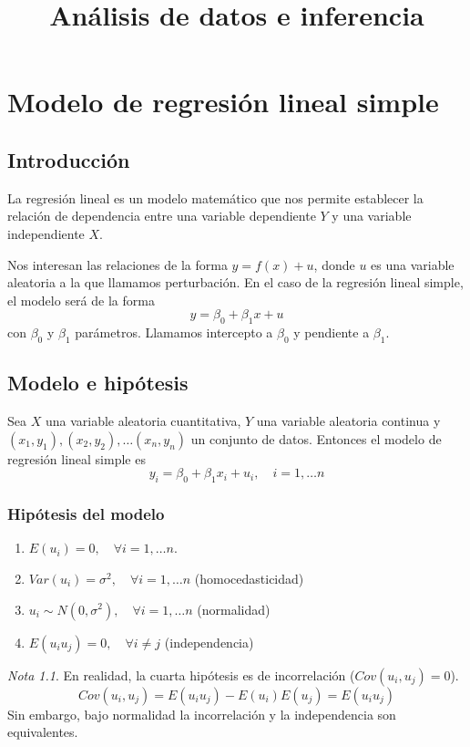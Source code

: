 \documentclass{report}
\title{Análisis de datos e inferencia}
\author{}
\theoremstyle{remark}
\theoremstyle{remark}
\newtheorem*{note}{Nota}
\theoremstyle{remark}
\theoremstyle{definition}
\theoremstyle{definition}
\theoremstyle{definition}
\begin{document}
\maketitle
\tableofcontents

\chapter{Modelo de regresión lineal simple}
\section{Introducción}

La regresión lineal es un modelo matemático que nos permite establecer la relación de dependencia entre una variable dependiente $Y$ y una variable independiente $X$.

Nos interesan las relaciones de la forma $y = f(x) + u$, donde $u$ es una variable aleatoria a la que llamamos perturbación.
En el caso de la regresión lineal simple, el modelo será de la forma $$y = \beta_0 + \beta_1x + u$$
con $\beta_0$ y $\beta_1$ parámetros.
Llamamos intercepto a $\beta_0$ y pendiente a $\beta_1$.

\section{Modelo e hipótesis}
Sea $X$ una variable aleatoria cuantitativa, $Y$ una variable aleatoria continua y $(x_1, y_1), (x_2, y_2), \dots (x_n, y_n)$ un conjunto de datos.
Entonces el modelo de regresión lineal simple es
$$y_i = \beta_0 + \beta_1x_i + u_i, \quad i = 1, \dots n$$

\subsection*{Hipótesis del modelo}
\begin{enumerate}
    \item $E(u_i) = 0, \quad \forall i = 1, \dots n$.
    \item $Var(u_i) = \sigma^2, \quad \forall i = 1, \dots n$ (homocedasticidad)
    \item $u_i \sim N(0, \sigma^2), \quad \forall i = 1, \dots n$ (normalidad)
    \item $E(u_i u_j) = 0, \quad \forall i \neq j$ (independencia)
\end{enumerate}

\begin{note}
    En realidad, la cuarta hipótesis es de incorrelación ($Cov(u_i, u_j) = 0$).
    $$Cov(u_i, u_j) = E(u_i u_j) - E(u_i)E(u_j) = E(u_i u_j)$$
    Sin embargo, bajo normalidad la incorrelación y la independencia son equivalentes.
\end{note}
\end{document}
